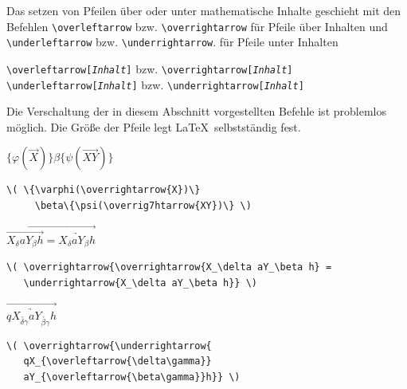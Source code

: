 \documentclass[a4paper,10pt,twoside]{scrbook}
\begin{document}
{Das setzen von Pfeilen über oder unter 
mathematische Inhalte geschieht mit den Befehlen 
\verb!\overleftarrow! bzw. 
\verb!\overrightarrow! 
für Pfeile über Inhalten und 
\verb!\underleftarrow! bzw. 
\verb!\underrightarrow!. für 
Pfeile unter Inhalten


\begin{boxedminipage}{\textwidth}
\texttt{\textbackslash overleftarrow[{\textsl{Inhalt}}]} bzw. \texttt{\textbackslash overrightarrow[{\textsl{Inhalt}}]}\\
\texttt{\textbackslash underleftarrow[{\textsl{Inhalt}}]} bzw. \texttt{\textbackslash underrightarrow[{\textsl{Inhalt}}]}
\end{boxedminipage}


Die Verschaltung der in diesem Abschnitt vorgestellten Befehle ist problemlos möglich.
Die Größe der Pfeile legt \LaTeX\ selbstständig fest.

\begin{minipage}[c]{.25\textwidth}
\setlength{\parskip}{1em}
\centering
\( \{\varphi(\overrightarrow{X})\}
     \beta\{\psi(\overrightarrow{XY})\} \)
\end{minipage}
\hfill
\begin{minipage}[c]{.73\textwidth}
\setlength{\parskip}{1em}
\begin{lstlisting}[label=overrightarrowbeispiel, style=customlatex]
\( \{\varphi(\overrightarrow{X})\}
     \beta\{\psi(\overrig7htarrow{XY})\} \)
\end{lstlisting}
\end{minipage}

\begin{minipage}[c]{.25\textwidth}
\setlength{\parskip}{1em}
\centering
\( \overrightarrow{\overrightarrow{X_\delta aY_\beta h} = 
   \underrightarrow{X_\delta aY_\beta h}} \)
\end{minipage}
\hfill
\begin{minipage}[c]{.73\textwidth}
\setlength{\parskip}{1em}
\begin{lstlisting}[label=underrightarrowbeispiel, style=customlatex]
\( \overrightarrow{\overrightarrow{X_\delta aY_\beta h} = 
   \underrightarrow{X_\delta aY_\beta h}} \)
\end{lstlisting}
\end{minipage}

\begin{minipage}[c]{.25\textwidth}
\setlength{\parskip}{1em}
\centering
\( \overrightarrow{\underrightarrow{q X_{\overleftarrow{\delta\gamma}} 
                                    a Y_{\overleftarrow{\beta\gamma}}h}} \)
\end{minipage}
\hfill
\begin{minipage}[c]{.73\textwidth}
\setlength{\parskip}{1em}
\begin{lstlisting}[label=overleftarrowbeispiel, style=customlatex]
\( \overrightarrow{\underrightarrow{
   qX_{\overleftarrow{\delta\gamma}} 
   aY_{\overleftarrow{\beta\gamma}}h}} \)
\end{lstlisting}
\end{minipage}


}
\end{document}
